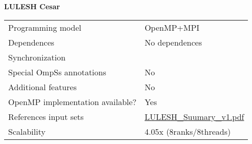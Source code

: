 
\section*{}
\label{lulesh_mpi_cesar}

\centering
\Huge
\textbf{LULESH Cesar}

\begin{table}[h!]
  \large
  \centering
  \begin{tabular}{|l|l|}
    \hline
    Programming model                &  OpenMP+MPI\\
    Dependences                      &  No dependences\\
    Synchronization                  &  \\
    Special OmpSs annotations        &  No\\
    Additional features              &  No\\
    OpenMP implementation available? &  Yes\\
    References input sets            &  \href{https://asc.llnl.gov/CORAL-benchmarks/Summaries/LULESH_Summary_v1.pdf}{LULESH\_Suumary\_v1.pdf}\\
    Scalability                      &  4.05x (8ranks/8threads)\\
    \hline
  \end{tabular}
\end{table}

\newpage
